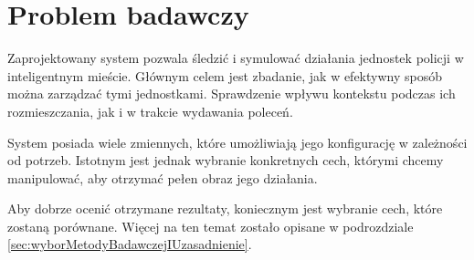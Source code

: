 \section{Problem badawczy}
\label{sec:problemBadawczy}

\par Zaprojektowany system pozwala śledzić i symulować działania jednostek policji w inteligentnym mieście. Głównym celem jest zbadanie, jak w efektywny sposób można zarządzać tymi jednostkami. Sprawdzenie wpływu kontekstu podczas ich rozmieszczania, jak i w trakcie wydawania poleceń.

\par System posiada wiele zmiennych, które umożliwiają jego konfigurację w zależności od potrzeb. Istotnym jest jednak wybranie konkretnych cech, którymi chcemy manipulować, aby otrzymać pełen obraz jego działania.

\par Aby dobrze ocenić otrzymane rezultaty, koniecznym jest wybranie cech, które zostaną porównane. Więcej na ten temat zostało opisane w podrozdziale \ref{sec:wyborMetodyBadawczejIUzasadnienie}.